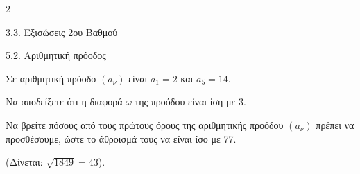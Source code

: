 \begin{ylh}{2}
    \item 3.3. Εξισώσεις 2ου Βαθμού
    \item 5.2. Αριθμητική πρόοδος
\end{ylh}
Σε αριθμητική πρόοδο $(a_\nu)$ είναι $a_1 = 2$ και $a_5 = 14$.
\begin{alist}
\item Να αποδείξετε ότι η διαφορά $\omega$ της προόδου είναι ίση με 3.
\item Να βρείτε πόσους από τους πρώτους όρους της αριθμητικής προόδου $(a_\nu)$ πρέπει να προσθέσουμε, ώστε το άθροισμά τους να είναι ίσο με 77.

(Δίνεται: $\sqrt{1849} = 43$).
\end{alist}

